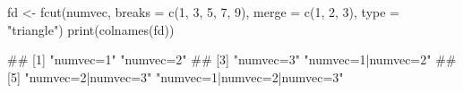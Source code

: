 \begin{Schunk}
% --begin: "fcut.merge2"
\begin{Sinput}
fd <- fcut(numvec, breaks = c(1, 3, 5, 7, 9), merge = c(1, 2, 3), type = "triangle")
print(colnames(fd))
\end{Sinput}
\begin{Soutput}
## [1] "numvec=1"                   "numvec=2"                  
## [3] "numvec=3"                   "numvec=1|numvec=2"         
## [5] "numvec=2|numvec=3"          "numvec=1|numvec=2|numvec=3"
\end{Soutput}
%
% --end: "fcut.merge2"
\end{Schunk}

